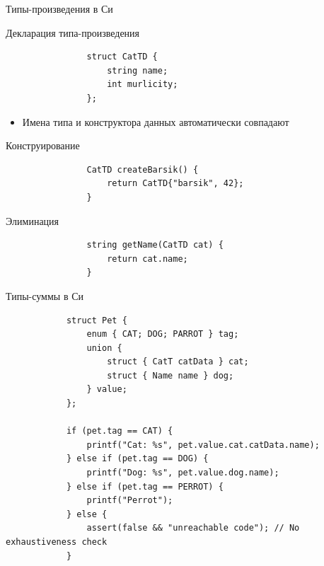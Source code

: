 
    \begin{frame}[fragile]{Типы-произведения в Си \popslide}
        \begin{block}{Декларация типа-произведения}
            \begin{verbatim}
                struct CatTD {
                    string name;
                    int murlicity;
                };
            \end{verbatim}
            \begin{itemize}
                \item Имена типа и конструктора данных автоматически совпадают
            \end{itemize}
        \end{block}
        \begin{block}{Конструирование}
            \begin{verbatim}
                CatTD createBarsik() {
                    return CatTD{"barsik", 42};
                }
            \end{verbatim}
        \end{block}
        \begin{block}{Элиминация}
            \begin{verbatim}
                string getName(CatTD cat) {
                    return cat.name;
                }
            \end{verbatim}
        \end{block}
    \end{frame}

    \begin{frame}[fragile]{Типы-суммы в Си \popslide}
        \begin{verbatim}
            struct Pet {
                enum { CAT; DOG; PARROT } tag;
                union {
                    struct { CatT catData } cat;
                    struct { Name name } dog;
                } value;
            };

            if (pet.tag == CAT) {
                printf("Cat: %s", pet.value.cat.catData.name);
            } else if (pet.tag == DOG) {
                printf("Dog: %s", pet.value.dog.name);
            } else if (pet.tag == PERROT) {
                printf("Perrot");
            } else {
                assert(false && "unreachable code"); // No exhaustiveness check
            }
        \end{verbatim}
    \end{frame}

